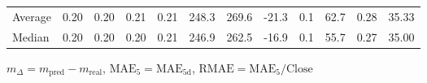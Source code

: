 \begin{threeparttable}
{\begin{tabular}{lrrrrrrrrrrr}
Average &          0.20 &          0.20 &          0.21 &        0.21 &               248.3 &               269.6 &      -21.3 &                 0.1 &             62.7 &            0.28 &                  35.33 \\
 Median &          0.20 &          0.20 &          0.20 &        0.21 &               246.9 &               262.5 &      -16.9 &                 0.1 &             55.7 &            0.27 &                  35.00 \\
\bottomrule
\end{tabular}
}
\begin{tablenotes}\footnotesize
\item $m_\Delta=m_{\text{pred}}-m_{\text{real}}$,
$\mathrm{MAE}_5=\mathrm{MAE}_{5\text{d}}$,
$\mathrm{RMAE}=\mathrm{MAE}_5/\text{Close}$
\end{tablenotes}
\end{threeparttable}
\endgroup

